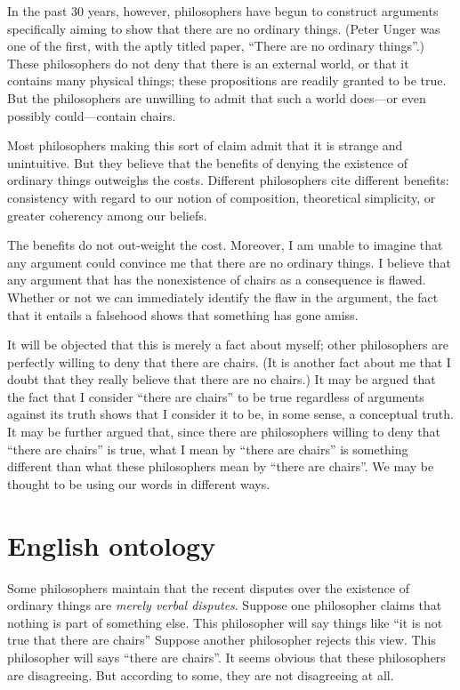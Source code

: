 \documentclass[11pt]{article}
\begin{document}
\begin{spacing}{1.25}
In the past 30 years, however, philosophers have begun to construct
arguments specifically aiming to show that there are no ordinary
things.  (Peter Unger was one of the first, with the aptly titled
paper, ``There are no ordinary things''.)  These philosophers do not
deny that there is an external world, or that it contains many
physical things; these propositions are readily granted to be true.
But the philosophers are unwilling to admit that such a world
does---or even possibly could---contain chairs.

Most philosophers making this sort of claim admit that it is strange
and unintuitive.  But they believe that the benefits of denying the
existence of ordinary things outweighs the costs.  Different
philosophers cite different benefits: consistency with regard to our
notion of composition, theoretical simplicity, or greater coherency
among our beliefs.  

The benefits do not out-weight the cost.  Moreover, I am unable to
imagine that any argument could convince me that there are no ordinary
things.  I believe that any argument that has the nonexistence of
chairs as a consequence is flawed.  Whether or not we can immediately
identify the flaw in the argument, the fact that it entails a
falsehood shows that something has gone amiss.

It will be objected that this is merely a fact about myself; other
philosophers are perfectly willing to deny that there are chairs.  (It
is another fact about me that I doubt that they really believe that
there are no chairs.)  It may be argued that the fact that I consider
``there are chairs'' to be true regardless of arguments against its
truth shows that I consider it to be, in some sense, a conceptual
truth.  It may be further argued that, since there are philosophers
willing to deny that ``there are chairs'' is true, what I mean by
``there are chairs'' is something different than what these
philosophers mean by ``there are chairs''.  We may be thought to be
using our words in different ways.

\section{English ontology}
\label{english}
Some philosophers maintain that the recent disputes over the existence
of ordinary things are {\em merely verbal disputes}.  Suppose one
philosopher claims that nothing is part of something else.  This
philosopher will say things like ``it is not true that there are
chairs'' Suppose another philosopher rejects this view.  This
philosopher will says ``there are chairs''.  It seems obvious that
these philosophers are disagreeing.  But according to some, they are
not disagreeing at all.  


\end{spacing}
\end{document}
